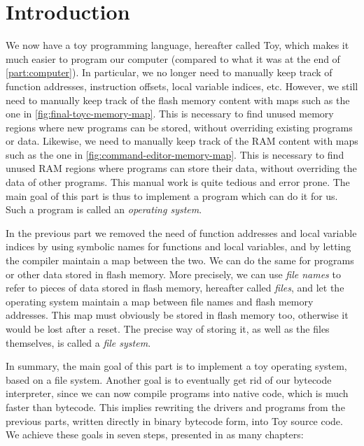 
\chapter*{Introduction}

We now have a toy programming language, hereafter called Toy, which makes it
much easier to program our computer (compared to what it was at the end of
\cref{part:computer}). In particular, we no longer need to manually keep track
of function addresses, instruction offsets, local variable indices, etc.
However, we still need to manually keep track of the flash memory content with
maps such as the one in \cref{fig:final-toyc-memory-map}. This is necessary to
find unused memory regions where new programs can be stored, without overriding
existing programs or data. Likewise, we need to manually keep track of the RAM
content with maps such as the one in \cref{fig:command-editor-memory-map}. This
is necessary to find unused RAM regions where programs can store their data,
without overriding the data of other programs. This manual work is quite
tedious and error prone. The main goal of this part is thus to implement a
program which can do it for us. Such a program is called an {\em operating
system}.

In the previous part we removed the need of function addresses and local
variable indices by using symbolic names for functions and local variables, and
by letting the compiler maintain a map between the two. We can do the same for
programs or other data stored in flash memory. More precisely, we can use {\em
file names} to refer to pieces of data stored in flash memory, hereafter called
{\em files}, and let the operating system maintain a map between file names and
flash memory addresses. This map must obviously be stored in flash memory too,
otherwise it would be lost after a reset. The precise way of storing it, as
well as the files themselves, is called a {\em file system}.

In summary, the main goal of this part is to implement a toy operating system,
based on a file system. Another goal is to eventually get rid of our bytecode
interpreter, since we can now compile programs into native code, which is much
faster than bytecode. This implies rewriting the drivers and programs from the
previous parts, written directly in binary bytecode form, into Toy source code.
We achieve these goals in seven steps, presented in as many chapters:

